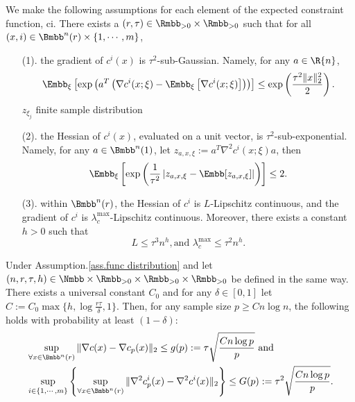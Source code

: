 {\color{red} \noindent\makebox[\linewidth]{\rule{0.6\paperwidth}{1pt}}}
\bassumption\label{ass.func distribution}
We make the following assumptions for each element of the expected constraint function, ci. There exists a $(r,\tau)\in\Rmbb_{>0}\times\Rmbb_{>0}$ such that for all $(x,i)\in\Bmbb^n(r)\times\{1,\cdots,m\}$,\begin{itemize}
	\item[(1).] the gradient of $c^i(x)$ is $\tau^2$-sub-Gaussian. Namely, for any $a\in\R{n}$,
	\[
	\Embb_\xi\left[\exp\left(a^T\left(\nabla c^i(x;\xi)-\Embb_\xi\left[\nabla c^i(x;\xi)\right]\right)\right)\right]    \le \exp\left(\frac{\tau^2\|x\|_2^2}{2}\right).
	\]
	$z_{\xi_j}$ finite sample distribution
	\item[(2).] the Hessian of $c^i(x)$, evaluated on a unit vector, is $\tau^2$-sub-exponential. Namely, for any $a\in\Bmbb^n(1)$, let $z_{a,x,\xi}:=a^T\nabla^2 c^i(x;\xi)a$, then
	\[
	\Embb_\xi\left[\exp\left(\frac{1}{\tau^2}\left|z_{a,x,\xi}-\Embb[z_{a,x,\xi}]\right|\right)\right]\le2.
	\]
\item[(3).]
within $\Bmbb^n(r)$, the Hessian of $c^i$ is $L$-Lipschitz continuous, and the gradient of $c^i$ is $\lambda_c^{\max}$-Lipschitz continuous. Moreover, there exists a constant $h>0$ such that
\[
L\le\tau^3n^{h},\text{and }\lambda_c^{\max}\le\tau^2n^h.
\]
	
\end{itemize} 
\eassumption   
\btheorem
\label{theo.sample-average-result}
Under Assumption.\ref{ass.func distribution} and let $(n,r,\tau,h)\in\Nmbb\times\Rmbb_{>0}\times\Rmbb_{>0}\times\Rmbb_{>0}$ be defined in the same way. There exists a universal constant $C_0$ and for any $\delta\in[0,1]$ let $C:=C_0\max\{h,\log\frac{r\tau}{\delta},1\}$.
 Then, for any sample size $p\ge Cn\log n$, the following holds with probability at least $(1-\delta)$:
\begin{equation}
	\label{ineq:assump on conerg}
	\begin{aligned}
		&\sup_{\forall x\in\Bmbb^n(r)}\|\nabla c(x)-\nabla c_p(x)\|_2\le g(p):=\tau\sqrt{\frac{Cn\log p}{p}}\text{ and}\\
		&\sup_{i\in\{1,\cdots, m\}}\left\{\sup_{\forall x\in\Bmbb^n(r)}\|\nabla^2 c^i_p(x)-\nabla^2c^i(x)\|_2\right\}\le G(p):=\tau^2\sqrt{\frac{Cn\log p}{p}}\text{}.	
		\end{aligned}
\end{equation}
\etheorem

